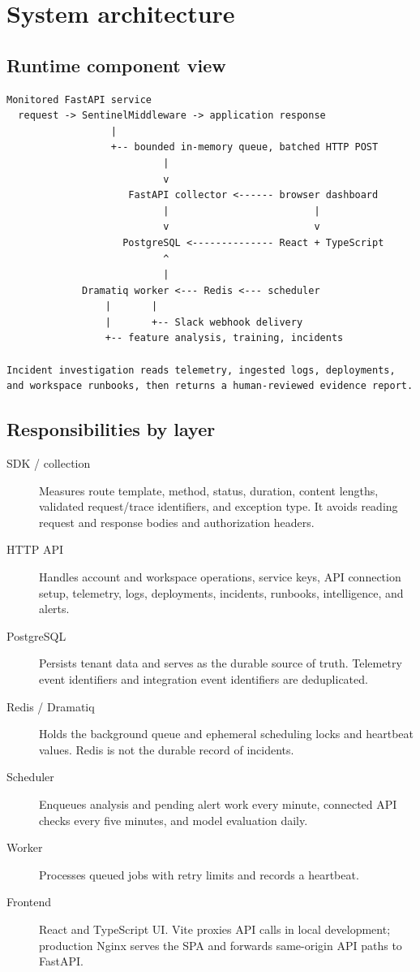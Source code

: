 \documentclass[11pt,a4paper]{article}
\begin{document}
\section{System architecture}

\subsection{Runtime component view}
\begin{lstlisting}
Monitored FastAPI service
  request -> SentinelMiddleware -> application response
                  |
                  +-- bounded in-memory queue, batched HTTP POST
                           |
                           v
                     FastAPI collector <------ browser dashboard
                           |                         |
                           v                         v
                    PostgreSQL <-------------- React + TypeScript
                           ^
                           |
             Dramatiq worker <--- Redis <--- scheduler
                 |       |
                 |       +-- Slack webhook delivery
                 +-- feature analysis, training, incidents

Incident investigation reads telemetry, ingested logs, deployments,
and workspace runbooks, then returns a human-reviewed evidence report.
\end{lstlisting}

\subsection{Responsibilities by layer}
\begin{description}
  \item[SDK / collection] Measures route template, method, status, duration,
  content lengths, validated request/trace identifiers, and exception type. It
  avoids reading request and response bodies and authorization headers.
  \item[HTTP API] Handles account and workspace operations, service keys,
  API connection setup, telemetry, logs, deployments, incidents, runbooks,
  intelligence, and alerts.
  \item[PostgreSQL] Persists tenant data and serves as the durable source of
  truth. Telemetry event identifiers and integration event identifiers are
  deduplicated.
  \item[Redis / Dramatiq] Holds the background queue and ephemeral scheduling
  locks and heartbeat values. Redis is not the durable record of incidents.
  \item[Scheduler] Enqueues analysis and pending alert work every minute,
  connected API checks every five minutes, and model evaluation daily.
  \item[Worker] Processes queued jobs with retry limits and records a heartbeat.
  \item[Frontend] React and TypeScript UI. Vite proxies API calls in local
  development; production Nginx serves the SPA and forwards same-origin API
  paths to FastAPI.
\end{description}
\end{document}
